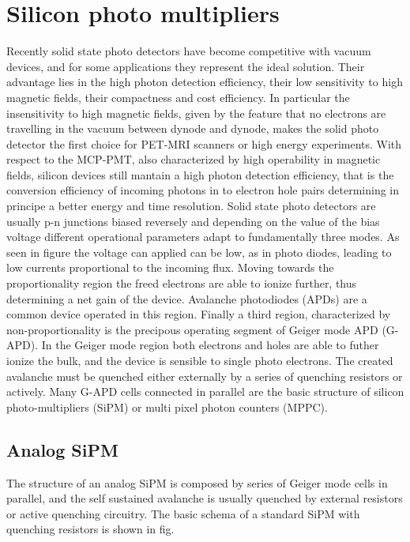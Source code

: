 \section{Silicon photo multipliers}
Recently solid state photo detectors have become competitive with vacuum devices, and for some applications they represent the ideal solution. Their advantage lies in the high photon detection efficiency, their low sensitivity to high magnetic fields, their compactness and cost efficiency.
In particular the insensitivity to high magnetic fields, given by the feature that no electrons are travelling in the vacuum between dynode and dynode, makes the solid photo detector the first choice for PET-MRI scanners or high energy experiments. With respect to the MCP-PMT, also characterized by high operability in magnetic fields, silicon devices still mantain a high photon detection efficiency, that is the conversion efficiency of incoming photons in to electron hole pairs determining in principe a better energy and time resolution.
Solid state photo detectors are usually p-n junctions biased reversely and depending on the value of the bias voltage different operational parameters adapt to fundamentally three modes.
As seen in figure 
the voltage can applied can be low, as in photo diodes, leading to low currents proportional to the incoming flux. Moving towards the proportionality region the freed electrons are able to ionize further, thus determining a net gain of the device. Avalanche photodiodes (APDs) are a common device operated in this region.
Finally a third region, characterized by non-proportionality is the precipous operating segment of Geiger mode APD (G-APD). In the Geiger mode region both electrons and holes are able to futher ionize the bulk, and the device is sensible to single photo electrons. The created avalanche must be quenched either externally by a series of quenching resistors or actively.
Many G-APD cells connected in parallel are the basic structure of silicon photo-multipliers (SiPM) or multi pixel photon counters (MPPC).
 
\subsection{Analog SiPM}
The structure of an analog SiPM is composed by series of Geiger mode cells in parallel, and the self sustained avalanche is usually quenched by external resistors or active quenching circuitry. The basic schema of a standard SiPM with quenching resistors is shown in fig.

